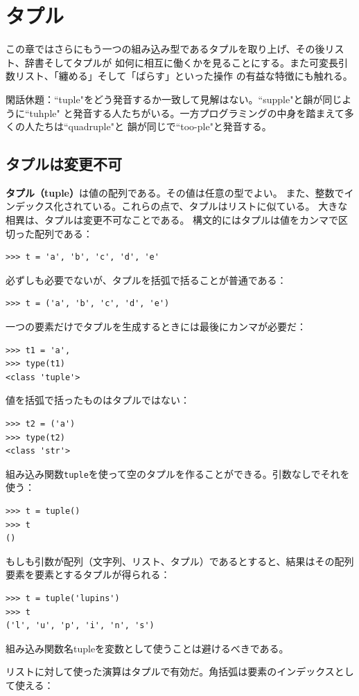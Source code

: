 \documentclass[a4j,12pt,makeidx]{jbook}
\begin{document}
\chapter{タプル}
この章ではさらにもう一つの組み込み型であるタプルを取り上げ、その後リスト、辞書そしてタプルが
如何に相互に働くかを見ることにする。また可変長引数リスト、「纏める」そして「ばらす」といった操作
の有益な特徴にも触れる。\par
閑話休題：``tuple"をどう発音するか一致して見解はない。``supple"と韻が同じように``tuhple"
と発音する人たちがいる。一方プログラミングの中身を踏まえて多くの人たちは``quadruple"と
韻が同じで``too-ple"と発音する。
%
\section{タプルは変更不可}
{\bf タプル（tuple）}は値の配列である。その値は任意の型でよい。
また、整数でインデックス化されている。これらの点で、タプルはリストに似ている。
大きな相異は、タプルは変更不可なことである。
構文的にはタプルは値をカンマで区切った配列である：
\begin{verbatim}
>>> t = 'a', 'b', 'c', 'd', 'e'
\end{verbatim}
必ずしも必要でないが、タプルを括弧で括ることが普通である：
\begin{verbatim}
>>> t = ('a', 'b', 'c', 'd', 'e')
\end{verbatim} \par
一つの要素だけでタプルを生成するときには最後にカンマが必要だ：
\begin{verbatim}
>>> t1 = 'a',
>>> type(t1)
<class 'tuple'>
\end{verbatim}
値を括弧で括ったものはタプルではない：
\begin{verbatim}
>>> t2 = ('a')
>>> type(t2)
<class 'str'>
\end{verbatim} \par
組み込み関数{\tt tuple}を使って空のタプルを作ることができる。引数なしでそれを使う：
\begin{verbatim}
>>> t = tuple()
>>> t
()
\end{verbatim} \par
もしも引数が配列（文字列、リスト、タプル）であるとすると、結果はその配列要素を要素とするタプルが得られる：
\begin{verbatim}
>>> t = tuple('lupins')
>>> t
('l', 'u', 'p', 'i', 'n', 's')
\end{verbatim}
組み込み関数名tupleを変数として使うことは避けるべきである。\par
リストに対して使った演算はタプルで有効だ。角括弧は要素のインデックスとして使える：
\end{document}
